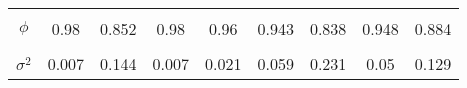 \begin{footnotesize}
\begin{singlespace}
\begin{tabular}{ccccccccc}
 & \begin{tiny} [-1.693,-1.581] \end{tiny}  & \begin{tiny} [-1.403,-1.325] \end{tiny}  & \begin{tiny} [-1.694,-1.582] \end{tiny}  & \begin{tiny} [-1.493,-1.384] \end{tiny}  & \begin{tiny} [-2.393,-2.275] \end{tiny}  & \begin{tiny} [-2.05,-1.962] \end{tiny}  & \begin{tiny} [-2.386,-2.266] \end{tiny}  & \begin{tiny} [-1.989,-1.903] \end{tiny}  \\ 
$ \phi $ & 0.98 & 0.852 & 0.98 & 0.96 & 0.943 & 0.838 & 0.948 & 0.884 \\ 
 & \begin{tiny} [0.973,0.987] \end{tiny}  & \begin{tiny} [0.826,0.877] \end{tiny}  & \begin{tiny} [0.973,0.987] \end{tiny}  & \begin{tiny} [0.943,0.974] \end{tiny}  & \begin{tiny} [0.929,0.959] \end{tiny}  & \begin{tiny} [0.817,0.862] \end{tiny}  & \begin{tiny} [0.934,0.962] \end{tiny}  & \begin{tiny} [0.862,0.906] \end{tiny}  \\ 
$ \sigma^{2} $ & 0.007 & 0.144 & 0.007 & 0.021 & 0.059 & 0.231 & 0.05 & 0.129 \\ 

\end{tabular}
\end{singlespace}
\end{footnotesize}
